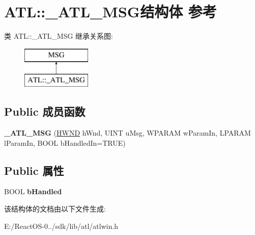 \hypertarget{struct_a_t_l_1_1___a_t_l___m_s_g}{}\section{A\+TL\+:\+:\+\_\+\+A\+T\+L\+\_\+\+M\+S\+G结构体 参考}
\label{struct_a_t_l_1_1___a_t_l___m_s_g}
类 A\+TL\+:\+:\+\_\+\+A\+T\+L\+\_\+\+M\+SG 继承关系图\+:\begin{figure}[H]
\begin{center}
\leavevmode
\includegraphics[height=2.000000cm]{struct_a_t_l_1_1___a_t_l___m_s_g}
\end{center}
\end{figure}
\subsection*{Public 成员函数}
\begin{DoxyCompactItemize}
\item 
\mbox{\label{struct_a_t_l_1_1___a_t_l___m_s_g_a1729f585e4bc104c4f9197f69680ce6b}} 
{\bfseries \+\_\+\+A\+T\+L\+\_\+\+M\+SG} (\hyperlink{interfacevoid}{H\+W\+ND} h\+Wnd, U\+I\+NT u\+Msg, W\+P\+A\+R\+AM w\+Param\+In, L\+P\+A\+R\+AM l\+Param\+In, B\+O\+OL b\+Handled\+In=T\+R\+UE)
\end{DoxyCompactItemize}
\subsection*{Public 属性}
\begin{DoxyCompactItemize}
\item 
\mbox{\label{struct_a_t_l_1_1___a_t_l___m_s_g_a695130198157ee66bead6baf36eeb7a3}} 
B\+O\+OL {\bfseries b\+Handled}
\end{DoxyCompactItemize}


该结构体的文档由以下文件生成\+:\begin{DoxyCompactItemize}
\item 
E\+:/\+React\+O\+S-\/0../sdk/lib/atl/atlwin.\+h\end{DoxyCompactItemize}
